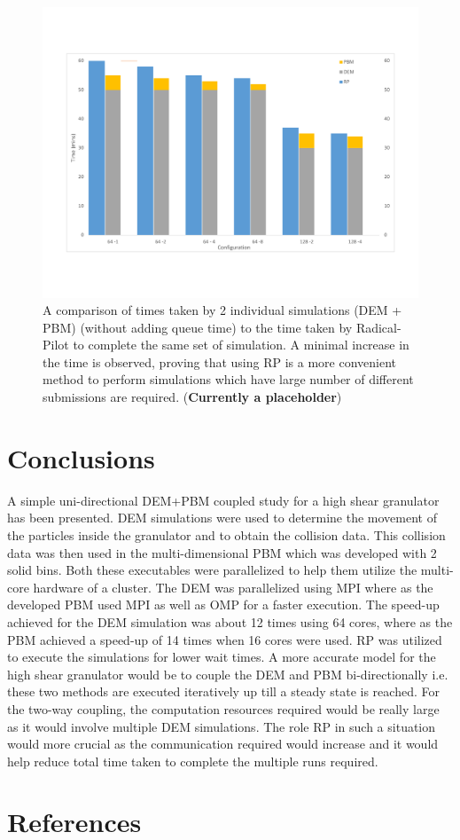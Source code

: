 \documentclass[preprint,11pt,authoryear]{elsarticle}
\begin{document}
\begin{figure}[H]
\centering
\includegraphics[scale=0.5]{rslts_RP_fake_plot.pdf}
\caption{A comparison of times taken by 2 individual simulations (DEM + PBM) (without adding queue time) to the  time taken by 
Radical-Pilot to complete the same set of simulation. A minimal increase in the time is observed, proving that using RP is 
a more convenient method to perform simulations which have large number of different submissions are required.
(\textbf{Currently a placeholder})}
\label{fig:rslts_RP_time_plot}
\end{figure}
	    
\section{Conclusions}
 A simple uni-directional DEM+PBM coupled study for a high shear granulator has been presented. DEM simulations were 
used to determine the movement of the particles inside the granulator and to obtain the collision data. This collision data 
was then used in the multi-dimensional PBM which was developed with 2 solid bins. Both these executables were parallelized 
to help them utilize the multi-core hardware of a cluster. The DEM was parallelized using MPI where as the developed PBM used 
MPI as well as OMP for a faster execution. The speed-up achieved for the DEM simulation was about 12 times using 64 cores, 
where as the PBM achieved a speed-up of 14 times when 16 cores were used. RP was utilized to execute the simulations for lower 
wait times.
 A more accurate model for the high shear granulator would be to couple the DEM and PBM bi-directionally i.e. these 
two methods are executed iteratively up till a steady state is reached. For the two-way coupling, the computation resources 
required would be really large as it would involve multiple DEM simulations. The role RP in such a situation would more crucial 
as the communication required would increase and it would help reduce total time taken to complete the multiple runs required. 

\section*{References} 


\end{document}
